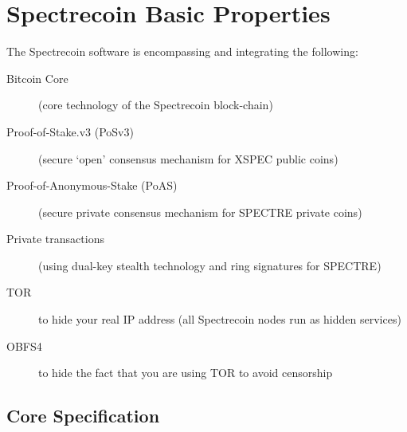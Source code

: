 \section{Spectrecoin Basic Properties}
The Spectrecoin software is encompassing and integrating the following:

\begin{description}
	\item[Bitcoin Core] (core technology of the Spectrecoin block-chain)
	\item[Proof-of-Stake.v3 (PoSv3)] (secure ‘open’ consensus mechanism 
	for XSPEC public coins)
	\item[Proof-of-Anonymous-Stake (PoAS)] (secure private consensus 
	mechanism for SPECTRE private coins)
	\item[Private transactions] (using dual-key stealth technology and 
	ring signatures for SPECTRE)
	\item[TOR] to hide your real IP address (all Spectrecoin nodes run as 
	hidden services)
	\item[OBFS4] to hide the fact that you are using TOR to avoid censorship
\end{description}



\subsection{Core Specification}

